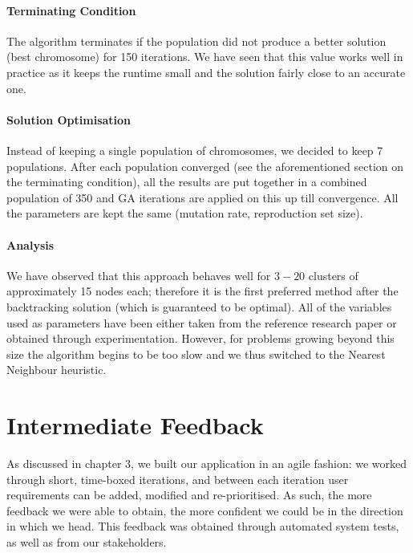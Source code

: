 \documentclass[a4paper, 10pt]{report}
\begin{document}
\subsubsection{Terminating Condition}
The algorithm terminates if the population did not produce a better solution (best chromosome) for 150 iterations. We have seen that this value works well in practice as it keeps the runtime small and the solution fairly close to an accurate one. 
\subsubsection{Solution Optimisation}
Instead of keeping a single population of chromosomes, we decided to keep 7 populations. After each population converged (see the aforementioned section on the terminating condition), all the results are put together in a combined population of 350 and GA iterations are applied on this up till convergence. All the parameters are kept the same (mutation rate, reproduction set size).
\subsubsection{Analysis}
We have observed that this approach behaves well for $3-20$ clusters of approximately 15 nodes each; therefore it is the first preferred method after the backtracking solution (which is guaranteed to be optimal). All of the variables used as parameters have been either taken from the reference research paper or obtained through experimentation. However, for problems growing beyond this size the algorithm begins to be too slow and we thus switched to the Nearest Neighbour heuristic.

\chapter{Intermediate Feedback}
As discussed in chapter 3, we built our application in an agile fashion: we worked through short, time-boxed iterations, and between each iteration user requirements can be added, modified and re-prioritised. As such, the more feedback we were able to obtain, the more confident we could be in the direction in which we head. This feedback was obtained through automated system tests, as well as from our stakeholders.
\end{document}

